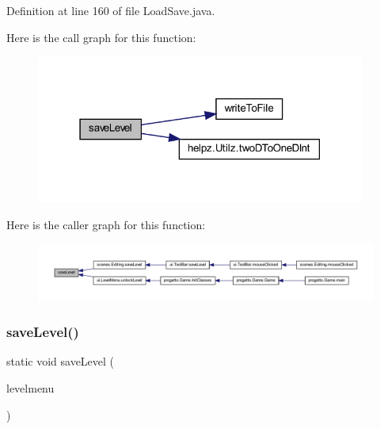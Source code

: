 Definition at line 160 of file Load\+Save.\+java.

Here is the call graph for this function\+:
\nopagebreak
\begin{figure}[H]
\begin{center}
\leavevmode
\includegraphics[width=307pt]{classhelpz_1_1_load_save_ae7a60134f1712407689bfe3c45bc04a1_cgraph}
\end{center}
\end{figure}
Here is the caller graph for this function\+:\nopagebreak
\begin{figure}[H]
\begin{center}
\leavevmode
\includegraphics[width=350pt]{classhelpz_1_1_load_save_ae7a60134f1712407689bfe3c45bc04a1_icgraph}
\end{center}
\end{figure}
\mbox{\label{classhelpz_1_1_load_save_a518631414c15c47704a28422e8fbdc33}} 
\subsubsection{\texorpdfstring{save\+Level()}{saveLevel()}\hspace{0.1cm}{\footnotesize\ttfamily [2/2]}}
{\footnotesize\ttfamily static void save\+Level (\begin{DoxyParamCaption}\item[{\hyperlink{classui_1_1_level_menu}{Level\+Menu}}]{levelmenu }\end{DoxyParamCaption})\hspace{0.3cm}{\ttfamily [static]}}



